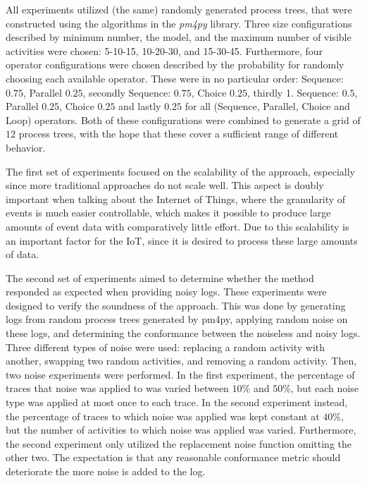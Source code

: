 \documentclass[runningheads]{template/llncs}
\begin{document}
\color{blue}
All experiments utilized (the same) randomly generated process trees, that were constructed using the algorithms in the \emph{pm4py} library.
Three size configurations described by minimum number, the model, and the maximum number of visible activities were chosen: 5-10-15, 10-20-30, and 15-30-45.
Furthermore, four operator configurations were chosen described by the probability for randomly choosing each available operator.
These were in no particular order: Sequence: $0.75$, Parallel $0.25$, secondly Sequence: $0.75$, Choice $0.25$, thirdly 1. Sequence: $0.5$, Parallel $0.25$, Choice $0.25$ and lastly $0.25$ for all (Sequence, Parallel, Choice and Loop) operators.
Both of these configurations were combined to generate a grid of $12$ process trees, with the hope that these cover a sufficient range of different behavior.
\color{black}

The first set of experiments focused on the scalability of the approach, especially since more traditional approaches do not scale well. This aspect is doubly important when talking about the Internet of Things, where the granularity of events is much easier controllable, which makes it possible to produce large amounts of event data with comparatively little effort.
Due to this scalability is an important factor for the IoT, since it is desired to process these large amounts of data.

The second set of experiments aimed to determine whether the method responded as expected when providing noisy logs.
These experiments were designed to verify the soundness of the approach.
This was done by generating logs from random process trees generated by pm4py, applying random noise on these logs, and determining the conformance between the noiseless and noisy logs.
\color{blue}
Three different types of noise were used: replacing a random activity with another, swapping two random activities, and removing a random activity.
Then,  two noise experiments were performed.
In the first experiment, the percentage of traces that noise was applied to was varied between $10\%$ and $50\%$, but each noise type was applied at most once to each trace.
In the second experiment instead, the percentage of traces to which noise was applied was kept constant at $40\%$, but the number of activities to which noise was applied was varied.
Furthermore, the second experiment only utilized the replacement noise function  omitting the other two.
\color{black}
The expectation is that any reasonable conformance metric should deteriorate the more noise is added to the log.
\end{document}
